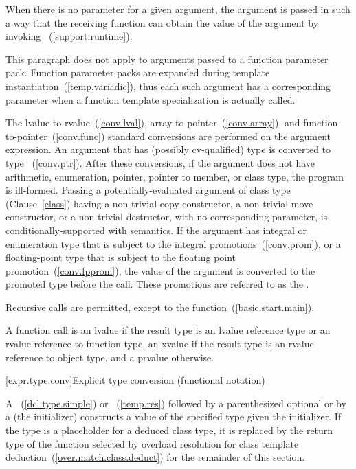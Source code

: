\pnum
{}%
When there is no parameter for a given argument, the argument is passed
in such a way that the receiving function can obtain the value of the
argument by invoking ~(\ref{support.runtime}).
\begin{note} This paragraph does not apply to arguments passed to a function parameter pack.
Function parameter packs are expanded during template instantiation~(\ref{temp.variadic}),
thus each such argument has a corresponding parameter when a function template
specialization is actually called. \end{note}
The
lvalue-to-rvalue~(\ref{conv.lval}), array-to-pointer~(\ref{conv.array}),
and function-to-pointer~(\ref{conv.func}) standard conversions are
performed on the argument expression.
An argument that has (possibly cv-qualified) type  is converted
to type ~(\ref{conv.ptr}).
After these conversions, if the
argument does not have arithmetic, enumeration, pointer, pointer to
member, or class type, the program is ill-formed. Passing a potentially-evaluated
argument of class type (Clause~\ref{class}) having a non-trivial
copy constructor, a non-trivial move constructor,
or a
non-trivial destructor, with no corresponding parameter, is conditionally-supported with
 semantics. If the argument has
integral or enumeration type that is subject to the integral
promotions~(\ref{conv.prom}), or a floating-point type that is subject to the floating
point promotion~(\ref{conv.fpprom}), the value of the argument is converted to the
promoted type before the call. These promotions are referred to as
the .

\pnum
{}%
Recursive calls are permitted, except to the 
function~(\ref{basic.start.main}).

\pnum
A function call is an lvalue
if the result type is an lvalue reference type or an rvalue reference to function type,
an xvalue if the result type is an rvalue reference to object type, and a prvalue
otherwise.

[expr.type.conv]{Explicit type conversion (functional notation)}

\pnum
{}%
%
%
%
%
A ~(\ref{dcl.type.simple}) or
~(\ref{temp.res}) followed
by a parenthesized optional  or
by a 
(the initializer)
constructs a value of the specified type
given the initializer.
%
If the type is a placeholder
for a deduced class type,
it is replaced by the return type
of the function selected by overload resolution
for class template deduction~(\ref{over.match.class.deduct})
for the remainder of this section.

